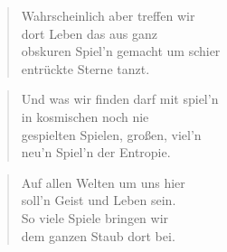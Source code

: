 \documentclass[10pt,a4paper]{article}
\begin{document}
\begin{paracol}{2}
\begin{verse}
Wahrscheinlich aber treffen wir \\
dort Leben das aus ganz \\
obskuren Spiel’n gemacht um schier \\
entrückte Sterne tanzt. \\
\end{verse}

\begin{verse}
Und was wir finden darf mit spiel’n \\
in kosmischen noch nie \\
gespielten Spielen, großen, viel’n \\
neu’n Spiel’n der Entropie. \\
\end{verse}

\begin{verse}
Auf allen Welten um uns hier \\
soll’n Geist und Leben sein. \\
So viele Spiele bringen wir \\
dem ganzen Staub dort bei. \\
\end{verse}

\end{paracol}
\end{document}
